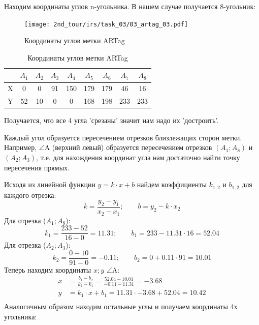 Находим координаты углов n-угольника. В нашем случае получается 8-угольник:
\begin{figure}[h!]
	\centering
	\texttt{[image: 2nd\_tour/irs/task\_03/03\_artag\_03.pdf]}
	\caption{Координаты углов метки ARTag}
	\label{fig:03_artag_03}
\end{figure}

\begin{table}[h!]
	\begin{center}
		\begin{tabular}{|c|c|c|c|c|c|c|c|c|}		
			\hline 
			& $A_1$ & $A_2$ & $A_3$ & $A_4$ & $A_5$ & $A_6$ & $A_7$ & $A_8$ \\ 
			\hline 
			X & 0 & 0 & 91 & 150 & 179 & 179 & 46 & 16 \\ 
			\hline 
			Y & 52 & 10 & 0 & 0 & 168 & 198 & 233 & 233 \\ 
			\hline 
		\end{tabular} 
		\caption{Координаты углов метки ARTag}
	\end{center}
\end{table}


Получается, что все 4 угла 'срезаны' значит нам надо их 'достроить'.

Каждый угол образуется пересечением отрезков близлежащих сторон метки. Например, $\angle$A (верхний левый) образуется пересечением отрезков $(A_1; A_8)$ и $(A_2; A_3)$, т.е. для нахождения координат угла нам достаточно найти точку пересечения прямых.

Исходя из линейной функции $y = k \cdot x + b$ найдем коэффициенты $k_{1,2}$ и $b_{1,2}$ для каждого отрезка:
\begin{equation*}
k=\frac{y_2-y_1}{x_2-x_1}; \qquad
b = y_2 - k \cdot x_2
\end{equation*}
Для отрезка ($A_1; A_8$):
\begin{equation*}
k_1=\frac{233-52}{16-0} = 11.31; \qquad
b_1 = 233 - 11.31 \cdot 16 = 52.04
\end{equation*}
Для отрезка ($A_2; A_3$):
\begin{equation*}
k_2 = \frac{0-10}{91-0} = -0.11; \qquad
b_2 = 0 + 0.11 \cdot 91 = 10.01
\end{equation*}
Теперь находим координаты $x; y$ $\angle$A:
\begin{equation*}
\begin{aligned}
x & = \frac{b_1-b_2}{k_2-k_1} =  \frac{52.04-10.01}{-0.11 - 11.31} = -3.68 \\
y &= k_1 \cdot x + b_1 = 11.31 \cdot -3.68 + 52.04 = 10.42 \\		
\end{aligned}
\end{equation*}
Аналогичным образом находим остальные углы и получаем координаты 4х угольника:\\

